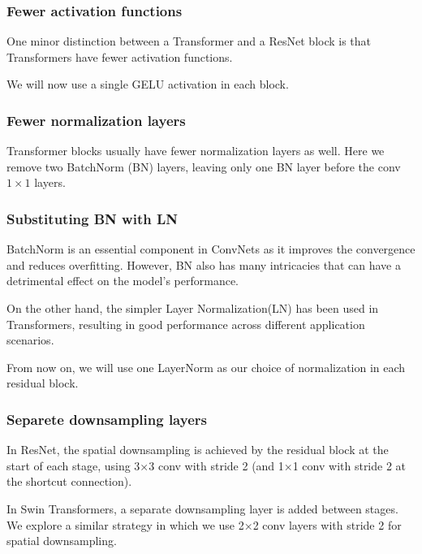 \documentclass[11pt]{article}
\begin{document}
\subsubsection{Fewer activation functions}
One minor distinction between a Transformer and a ResNet block is that Transformers have fewer activation functions.

We will now use a single GELU activation in each block.
\subsubsection{Fewer normalization layers}
Transformer blocks usually have fewer normalization layers as well. Here we remove two BatchNorm (BN) layers, leaving only one BN layer before the conv $1\times1$ layers.
\subsubsection{Substituting BN with LN}
BatchNorm is an essential component in ConvNets as it improves the convergence and reduces overfitting. However, BN also has many intricacies that can have a detrimental effect on the model’s performance.

On the other hand, the simpler Layer Normalization(LN) has been used in Transformers, resulting in
good performance across different application scenarios.

From now on, we will use one LayerNorm as our choice of normalization in each residual block.
\subsubsection{Separete downsampling layers}
In ResNet, the spatial downsampling is achieved by the residual block at the start of each stage, using 3×3 conv with stride 2 (and 1×1 conv with stride 2 at the shortcut connection).

In Swin Transformers, a separate downsampling layer is added between stages. We explore a similar strategy in which we use 2×2 conv layers with stride 2 for spatial downsampling.
\end{document}
